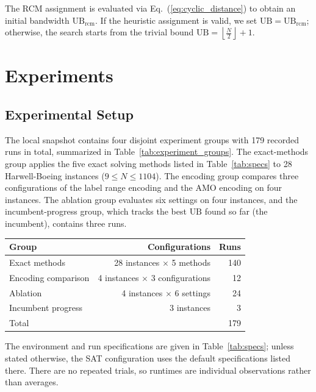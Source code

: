 \documentclass[a4paper,fleqn]{cas-sc}
\begin{document}
        The RCM assignment is evaluated via Eq.~(\ref{eq:cyclic_distance}) to obtain an initial bandwidth $\text{UB}_{\text{rcm}}$. If the heuristic assignment is valid, we set $\text{UB} = \text{UB}_{\text{rcm}}$; otherwise, the search starts from the trivial bound $\text{UB} = \left\lfloor \frac{N}{2} \right\rfloor + 1$.


\section{Experiments}

    \subsection{Experimental Setup}

        The local snapshot contains four disjoint experiment groups with 179 recorded runs in total, summarized in Table~\ref{tab:experiment_groups}. The exact-methods group applies the five exact solving methods listed in Table~\ref{tab:specs} to 28 Harwell-Boeing instances ($9 \le N \le 1104$). The encoding group compares three configurations of the label range encoding and the AMO encoding on four instances. The ablation group evaluates six settings on four instances, and the incumbent-progress group, which tracks the best $\text{UB}$ found so far (the incumbent), contains three runs.

        \begin{center}
        \centering
        \label{tab:experiment_groups}
        \begin{tabular}{lrr}
        \toprule
        Group & Configurations & Runs \\
        \midrule
        Exact methods & 28 instances $\times$ 5 methods & 140 \\
        Encoding comparison & 4 instances $\times$ 3 configurations & 12 \\
        Ablation & 4 instances $\times$ 6 settings & 24 \\
        Incumbent progress & 3 instances & 3 \\
        \midrule
        Total & & 179 \\
        \bottomrule
        \end{tabular}
        \end{center}

        The environment and run specifications are given in Table~\ref{tab:specs}; unless stated otherwise, the SAT configuration uses the default specifications listed there. There are no repeated trials, so runtimes are individual observations rather than averages.
\end{document}
